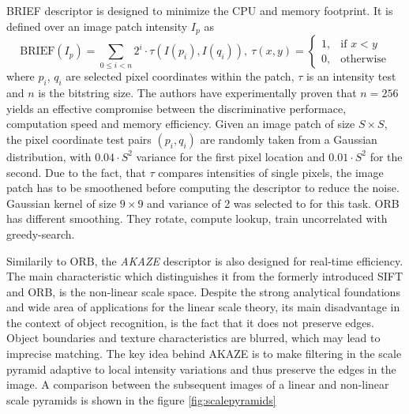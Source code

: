 BRIEF descriptor is designed to minimize the CPU and memory footprint. It is defined over an image patch intensity $I_p$ as
\begin{equation}
\mathrm{BRIEF}(I_p) = \sum \limits_{0\leq i < n}2^i\cdot \tau(I(p_i), I(q_i)),\ \tau(x, y) = \begin{cases} 1, & \mbox{if } x < y \\ 0, & \mbox{otherwise} \end{cases}
\end{equation}
where $p_i$, $q_i$ are selected pixel coordinates within the patch, $\tau$ is an intensity test and $n$ is the bitstring size. The authors have experimentally proven that $n=256$ yields an effective compromise between the discriminative performace, computation speed and memory efficiency. Given an image patch of size $S\times S$, the pixel coordinate test pairs $(p_i, q_i)$ are randomly taken from a Gaussian distribution, with $0.04\cdot S^2$ variance for the first pixel location and $0.01\cdot S^2$ for the second. Due to the fact, that $\tau$ compares intensities of single pixels, the image patch has to be smoothened before computing the descriptor to reduce the noise. Gaussian kernel of size $9\times 9$ and variance of 2 was selected to for this task. ORB has different smoothing. They rotate, compute lookup, train uncorrelated with greedy-search.

Similarily to ORB, the \textit{AKAZE} \cite{AKAZE} descriptor is also designed for real-time efficiency. The main characteristic which distinguishes it from the formerly introduced SIFT and ORB, is the non-linear scale space. Despite the strong analytical foundations and wide area of applications for the linear scale theory, its main disadvantage in the context of object recognition, is the fact that it does not preserve edges. Object boundaries and texture characteristics are blurred, which may lead to imprecise matching. The key idea behind AKAZE is to make filtering in the scale pyramid adaptive to local intensity variations and thus preserve the edges in the image. A comparison between the subsequent images of a linear and non-linear scale pyramids is shown in the figure \ref{fig:scalepyramids}

